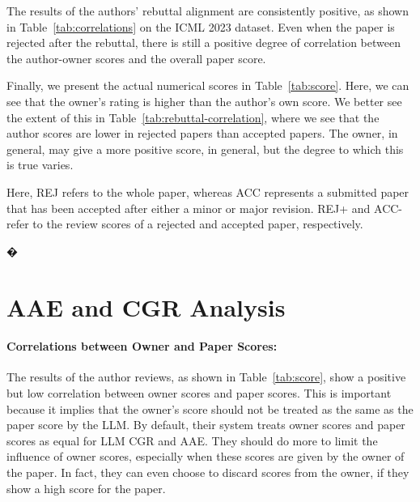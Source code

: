 \documentclass{article} %
\begin{document}
The results of the authors' rebuttal alignment are consistently positive, as shown in Table~\ref{tab:correlations} on the \textsc{ICML 2023} dataset. Even when the paper is rejected after the rebuttal, there is still a positive degree of correlation between the author-owner scores and the overall paper score. 

Finally, we present the actual numerical scores in Table~\ref{tab:score}. Here, we can see that the owner's rating is higher than the author's own score. We better see the extent of this in Table~\ref{tab:rebuttal-correlation}, where we see that the author scores are lower in rejected papers than accepted papers. The owner, in general, may give a more positive score, in general, but the degree to which this is true varies.

Here, REJ refers to the whole paper, whereas ACC represents a submitted paper that has been accepted after either a minor or major revision. REJ+ and ACC- refer to the review scores of a rejected and accepted paper, respectively.

\begin{table}[t]
\centering
\caption{The owner often gives a higher score than the author, especially when the authors are required to make a major revision.}
\label{tab:score}
\end{table}


�
\section{AAE and CGR Analysis}

\paragraph{Correlations between Owner and Paper Scores:}
The results of the author reviews, as shown in Table~\ref{tab:score}, show a positive but low correlation between owner scores and paper scores. This is important because it implies that the owner's score should not be treated as the same as the paper score by the LLM. By default, their system treats owner scores and paper scores as equal for LLM CGR and AAE. They should do more to limit the influence of owner scores, especially when these scores are given by the owner of the paper. In fact, they can even choose to discard scores from the owner, if they show a high score for the paper. 
\end{document}

